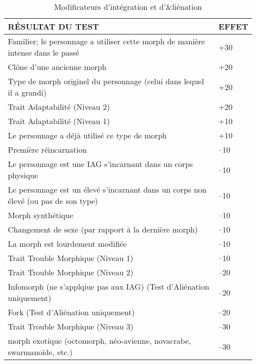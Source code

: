 \begin{table} \caption{Modificateurs d'intégration et d'&liénation} \begin{tabular}{|l|l|} 



\hline

RÉSULTAT DU TEST &EFFET\\ \hline

Familier; le personnage a utiliser cette morph de manière intense dans le passé &+30 \\ \hline

Clône d'une ancienne morph &+20 \\ \hline

Type de morph originel du personnage (celui dans lequel il a grandi) &+20 \\ \hline

Trait Adaptabilité (Niveau 2) &+20 \\ \hline

Trait Adaptabilité (Niveau 1) &+10 \\ \hline

Le personnage a déjà utilisé ce type de morph &+10 \\ \hline

Première réincarnation &–10 \\ \hline

Le personnage est une IAG s'incarnant dans un corps physique &–10 \\ \hline

Le personnage est un élevé s'incarnant dans un corps non élevé (ou pas de son type) &–10 \\ \hline

Morph synthétique &–10 \\ \hline

Changement de sexe (par rapport à la dernière morph) &–10 \\ \hline

La morph est lourdement modifiée &–10 \\ \hline

Trait Trouble Morphique (Niveau 1) &–10 \\ \hline

Trait Trouble Morphique (Niveau 2) &–20 \\ \hline

Infomorph (ne s'applqiue pas aux IAG) (Test d'Aliénation uniquement) &–20 \\ \hline

Fork (Test d'Aliénation uniquement) &–20 \\ \hline

Trait Trouble Morphique (Niveau 3) &–30 \\ \hline

morph exotique (octomorph, néo-avienne, novacrabe, swarmanoïde, etc.) &–30 \\ \hline

\end{tabular} \end{table} 

